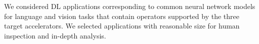 We considered \AppNum DL applications corresponding to common neural network models for language and vision tasks that contain operators supported by the three target accelerators.
We selected applications with reasonable size for human inspection and in-depth analysis.
%
%
